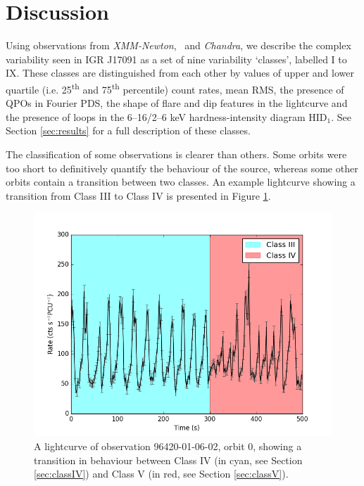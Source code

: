 \section{Discussion}

\par Using observations from \textit{XMM-Newton}, \rxte\ and \textit{Chandra}, we describe the complex variability seen in IGR J17091 as a set of nine variability `classes', labelled I to IX.  These classes are distinguished from each other by values of upper and lower quartile (i.e. 25\textsuperscript{th} and 75\textsuperscript{th} percentile) count rates, mean RMS, the presence of QPOs in Fourier PDS, the shape of flare and dip features in the lightcurve and the presence of loops in the 6--16/2--6 keV hardness-intensity diagram HID$_1$.  See Section \ref{sec:results} for a full description of these classes.
\par The classification of some observations is clearer than others.  Some orbits were too short to definitively quantify the behaviour of the source, whereas some other orbits contain a transition between two classes.  An example lightcurve showing a transition from Class III to Class IV is presented in Figure \ref{fig:HybridClasses}.

\begin{figure}
    \includegraphics[width=\columnwidth, trim =0cm 0 0cm 0]{images/mixJandK.png}
    \captionsetup{singlelinecheck=off}
    \caption{A lightcurve of observation 96420-01-06-02, orbit 0, showing a transition in behaviour between Class IV (in cyan, see Section \ref{sec:classIV}) and Class V (in red, see Section \ref{sec:classV}).}
   \label{fig:HybridClasses}
\end{figure}

